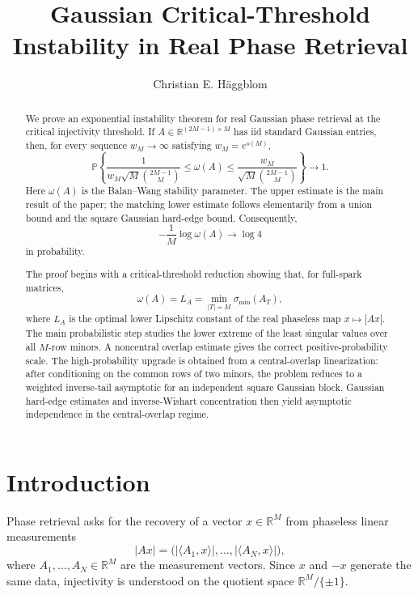 \documentclass[11pt]{article}
\title{Gaussian Critical-Threshold Instability in Real Phase Retrieval}
\author{Christian E. H{\"a}ggblom}
\date{}
\newcommand{\Pbb}{\mathbb P}
\newcommand{\1}{\mathbf 1}
\begin{document}
\maketitle

\begin{abstract}
We prove an exponential instability theorem for real Gaussian phase retrieval
at the critical injectivity threshold.  If
\(A\in\mathbb R^{(2M-1)\times M}\) has iid standard Gaussian entries, then, for
every sequence \(w_M\to\infty\) satisfying \(w_M=e^{o(M)}\),
\[
        \Pbb\left\{
        \frac{1}{
        w_M\sqrt M\binom{2M-1}{M}}
        \le
        \omega(A)
        \le
        \frac{w_M}{
        \sqrt M\binom{2M-1}{M}}
        \right\}
        \longrightarrow1.
\]
Here \(\omega(A)\) is the Balan--Wang stability parameter.  The upper estimate
is the main result of the paper; the matching lower estimate follows
elementarily from a union bound and the square Gaussian hard-edge bound.
Consequently,
\[
        -\frac1M\log\omega(A)
        \longrightarrow
        \log4
\]
in probability.

The proof begins with a critical-threshold reduction showing that, for
full-spark matrices,
\[
        \omega(A)
        =
        L_A
        =
        \min_{|T|=M}\sigma_{\min}(A_T),
\]
where \(L_A\) is the optimal lower Lipschitz constant of the real phaseless map
\(x\mapsto |Ax|\).  The main probabilistic step studies the lower extreme of
the least singular values over all \(M\)-row minors.  A noncentral overlap
estimate gives the correct positive-probability scale.  The high-probability
upgrade is obtained from a central-overlap linearization: after conditioning
on the common rows of two minors, the problem reduces to a weighted
inverse-tail asymptotic for an independent square Gaussian block.  Gaussian
hard-edge estimates and inverse-Wishart concentration then yield asymptotic
independence in the central-overlap regime.
\end{abstract}

\section{Introduction}

Phase retrieval asks for the recovery of a vector \(x\in\mathbb R^M\) from
phaseless linear measurements
\[
        |Ax| = \bigl(|\langle A_1,x\rangle|,\ldots,
        |\langle A_N,x\rangle|\bigr),
\]
where \(A_1,\ldots,A_N\in\mathbb R^M\) are the measurement vectors. Since
\(x\) and \(-x\) generate the same data, injectivity is understood on the
quotient space \(\mathbb R^M/\{\pm1\}\).
\end{document}
